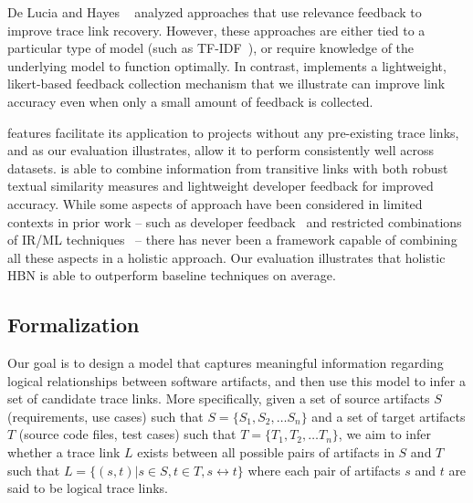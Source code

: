  De Lucia \etal \citep{DeLucia:ICSM'06} and Hayes \etal~\citep{Hayes:TSE'06} analyzed approaches that use relevance feedback to improve trace link recovery. However, these approaches are either tied to a particular type of model (such as TF-IDF~\citep{DeLucia:ICSM'06}), or require knowledge of the underlying model to function optimally. In contrast, \Comet implements a lightweight, likert-based feedback collection mechanism that we illustrate can improve link accuracy even when only a small amount of feedback is collected.
 
 \Comets features facilitate its application to projects without any pre-existing trace links, and as our evaluation illustrates, allow it to perform consistently well across datasets. \Comet is able to combine information from transitive links with both robust textual similarity measures and lightweight developer feedback for improved accuracy. While some aspects of \Comets approach have been considered in limited contexts in prior work -- such as developer feedback~\citep{DeLucia:ICSM'06,Hayes:TSE'06} and restricted combinations of IR/ML techniques~\citep{Gethers:ICSM'11} -- there has never been a framework capable of combining all these aspects in a holistic approach. Our evaluation illustrates that \Comets holistic HBN is able to outperform baseline techniques on average.

\subsection{Formalization}

Our goal is to design a model that captures meaningful information regarding logical relationships between software artifacts, and then use this model to infer a set of candidate trace links. More specifically, given a set of source artifacts $S$ (\eg requirements, use cases) such that $S = \{S_{1},S_{2},\ldots S_{n}\}$ and a set of target artifacts $T$ (\eg source code files, test cases) such that $T = \{T_{1},T_{2},\ldots T_{n}\}$, we aim to infer whether a trace link $L$ exists between all possible pairs of artifacts in $S$ and $T$ such that $L = \{(s,t) | s\in S, t\in T, s\leftrightarrow t\}$ where each pair of artifacts $s$ and $t$ are said to be logical trace links.



